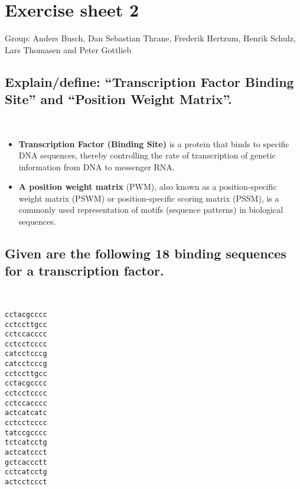 \documentclass[a4paper,10pt,titlepage]{article}
\begin{document}
\section*{Exercise sheet 2}

Group: Anders Busch, Dan Sebastian Thrane, Frederik Hertzum, Henrik Schulz, Lars Thomasen and Peter Gottlieb

\subsection*{Explain/define: “Transcription Factor Binding Site” and “Position Weight Matrix”.}\\

\begin{itemize}
\item
\textbf{Transcription Factor (Binding Site)} is a protein that binds to specific DNA sequences, thereby controlling the rate of transcription of genetic information from DNA to messenger RNA.
\item
\textbf{A position weight matrix} (PWM), also known as a position-specific weight matrix (PSWM) or position-specific scoring matrix (PSSM), is a commonly used representation of motifs (sequence patterns) in biological sequences.
\end{itemize}

\subsection*{Given are the following 18 binding sequences for a transcription
factor.}\\

\begin{verbatim}
cctacgcccc   
cctccttgcc
cctccacccc   
cctcctcccc
catcctcccg   
catcctcccg
cctccttgcc   
cctacgcccc
cctcctcccc   
cctccacccc
actcatcatc   
cctcctcccc
tatccgcccc   
tctcatcctg
actcatccct   
gctcaccctt
cctcatcctg   
actcctccct
\end{verbatim}
\end{document}
